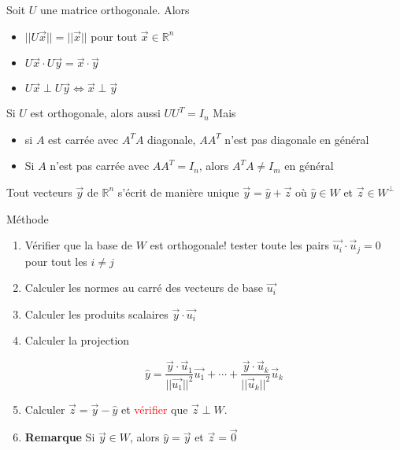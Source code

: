     \begin{theoreme}
        Soit $U$ une matrice orthogonale. Alors
        \begin{itemize}
            \item $||U\vec{x}|| = ||\vec{x}||$ pour tout $\vec{x} \in \mathbb{R}^n$
            \item $U\vec{x}\cdot U\vec{y} = \vec{x}\cdot \vec{y}$
            \item $U\vec{x} \perp U\vec{y} \Leftrightarrow \vec{x}\perp \vec{y}$
        \end{itemize}
    \end{theoreme}
    Si $U$ est orthogonale, alors aussi $UU^T = I_n$ Mais
    \begin{itemize}
        \item si $A$ est carrée avec $A^TA$ diagonale, $AA^T$ n'est pas diagonale en général
        \item Si $A$ n'est pas carrée avec $AA^T = I_n$, alors $A^TA \neq I_m$ en général
    \end{itemize}
    \begin{theoreme}
        Tout vecteurs $\vec{y}$ de $\mathbb{R}^n$ s'écrit de manière unique $\vec{y} = \hat{y}+\vec{z}$ où $\hat{y}\in W$ et $\vec{z}\in W^\perp$
    \end{theoreme}
\begin{parag}{Méthode}
    \begin{enumerate}
        \item Vérifier que la base de $W$ est orthogonale! tester toute les pairs $\vec{u_i}\cdot\vec{u}_j = 0$ pour tout les $i \neq j$
        \item Calculer les normes au carré des vecteurs de base $\vec{u_i}$
        \item Calculer les produits scalaires $\vec{y}\cdot\vec{u_i}$
        \item Calculer la projection
        \begin{formule}
            \[\hat{y} = \frac{\vec{y}\cdot \vec{u}_1}{||\vec{u_1}||^2}\vec{u_1} + \cdots + \frac{\vec{y}\cdot\vec{u}_k}{||\vec{u}_k||^2}\vec{u}_k\]
        \end{formule}
        \item Calculer $\vec{z} = \vec{y}-\hat{y}$ et \textcolor{red}{vérifier} que $\vec{z}\perp W$.
        \item \textbf{Remarque} Si $\vec{y} \in W$, alors $\hat{y} = \vec{y}$ et $\vec{z} = \vec{0}$
    \end{enumerate}
\end{parag}
